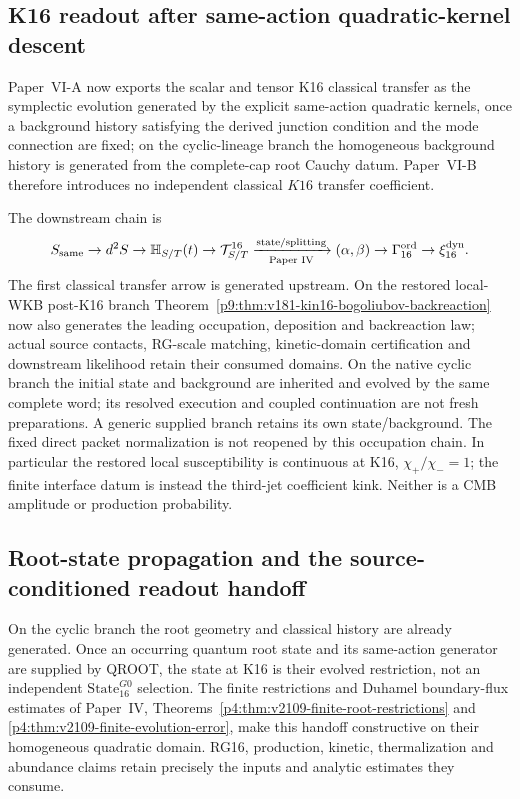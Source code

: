 \documentclass[12pt,a4paper]{article}
\begin{document}
\subsection{K16 readout after same-action quadratic-kernel descent}
\label{p9:sec:v189-k16-generated-transfer-import}
Paper~VI-A now exports the scalar and tensor K16 classical transfer as the
symplectic evolution generated by the explicit same-action quadratic kernels,
once a background history satisfying the derived junction condition and the
mode connection are fixed; on the cyclic-lineage branch the homogeneous
background history is generated from the complete-cap root Cauchy datum.  Paper~VI-B therefore introduces no independent
classical $K16$ transfer coefficient.

\begin{theorem}
\label{p9:thm:v189-k16-readout-boundary}
The downstream chain is
\[
 S_{\rm same}\to d^2S\to\mathbb H_{S/T}(t)
 \to\mathcal T_{S/T}^{16}
 \xrightarrow[\text{Paper IV}]{\text{state/splitting}}
 (\alpha,\beta)
 \to\Gamma_{16}^{\rm ord}\to\xi_{16}^{\rm dyn}.
\]
The first classical transfer arrow is generated upstream.  On the restored local-WKB post-K16 branch Theorem~\ref{p9:thm:v181-kin16-bogoliubov-backreaction}
now also generates the leading occupation, deposition and backreaction law;
actual source contacts, RG-scale matching, kinetic-domain certification and
downstream likelihood retain their consumed domains.  On the native cyclic
branch the initial state and background are inherited and evolved by the same
complete word; its resolved execution and coupled continuation are not fresh
preparations.  A generic supplied branch retains its own state/background.
The fixed direct packet normalization is not reopened by this occupation
chain.  In particular the restored local susceptibility is continuous at K16,
$\chi_+/\chi_-=1$; the finite interface datum is instead the third-jet
coefficient kink.  Neither is a CMB amplitude or production probability.
\end{theorem}


\subsection{Root-state propagation and the source-conditioned readout handoff}
\label{p9:sec:v2109-root-history-handoff}
On the cyclic branch the root geometry and classical history are already
generated.  Once an occurring quantum root state and its same-action
generator are supplied by QROOT, the state at K16 is their evolved
restriction, not an independent \(\mathrm{State}_{16}^{G0}\) selection.
The finite restrictions and Duhamel boundary-flux estimates of
Paper~IV, Theorems~\ref{p4:thm:v2109-finite-root-restrictions} and
\ref{p4:thm:v2109-finite-evolution-error}, make this handoff constructive
on their homogeneous quadratic domain.  RG16, production, kinetic,
thermalization and abundance claims retain precisely the inputs and
analytic estimates they consume.
\end{document}
